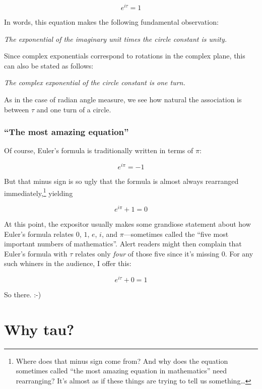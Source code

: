 \documentclass{article}
\begin{document}
\[ e^{i\tau} = 1 \]


In words, this equation makes the following fundamental observation: 

\begin{center}
\emph{The exponential of the imaginary unit times the circle constant is unity.} 
\end{center}

Since complex exponentials correspond to rotations in the complex plane, this can also be stated as follows:

\begin{center}
\emph{The complex exponential of the circle constant is one turn.}
\end{center}

\noindent As in the case of radian angle measure, we see how natural the association is between $\tau$ and one turn of a circle.

    \subsubsection{``The most amazing equation''} %
    \label{sec:_the_most_amazing_equation_}
    

Of course, Euler's formula is traditionally written in terms of $\pi$:


\[ e^{i\pi} = -1 \]

\noindent But that minus sign is so ugly that the formula is almost always rearranged immediately,\footnote{Where does that minus sign come from? And why does the equation sometimes called ``the most amazing equation in mathematics'' need rearranging? It's almost as if these things are trying to tell us something\ldots} yielding

\[ e^{i\pi} + 1 = 0 \]

\noindent At this point, the expositor usually makes some grandiose statement about how Euler's formula relates $0$, $1$, $e$, $i$, and $\pi$---sometimes called the ``five most important numbers of mathematics''. Alert readers might then complain that Euler's formula with $\tau$ relates only \emph{four} of those five since it's missing $0$. For any such whiners in the audience, I offer this:

\[ e^{i\tau} + 0 = 1 \]

\noindent So there. :-)

\section{Why tau?} %
\label{sec:why_tau}
\end{document}
